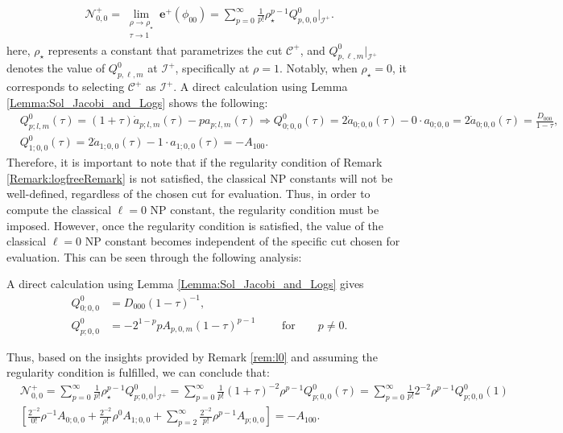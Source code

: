 \begin{align}
  \mathcal{N}^{+}_{0,0}= \lim_{\substack{\rho \to \rho_{\star} \\ \tau \to 1}}  \boldsymbol{e}^{+}(\phi_{00}) = \sum_{p=0}^{\infty} \frac{1}{p!}\rho^{p-1}_{\star}Q^{0}_{p,0,0}|_{\mathscr{I}^{+}}.
\end{align}
here, $\rho_{\star}$ represents a constant that parametrizes the cut $\mathcal{C}^{+}$, and $Q^{0}_{p,\ell,m}|_{\mathscr{I}^{+}}$ denotes the value of $Q^{0}_{p,\ell,m}$ at $\mathscr{I}^{+}$, specifically at $\rho=1$. Notably, when $\rho_{\star}=0$, it corresponds to selecting $\mathcal{C}^{+}$ as $\mathcal{I}^{+}$.
A direct calculation using Lemma \ref{Lemma:Sol_Jacobi_and_Logs} shows the following:
\begin{align}\label{eq:Q0lm}
  & Q_{p;l,m}^{0}(\tau)=(1+\tau) \dot{a}_{p ; l, m}(\tau)-pa_{p ; l, m}(\tau) \Rightarrow Q_{0;0,0}^{0}(\tau)=2 \dot{a}_{0;0,0}(\tau)-0 \cdot a_{0;0,0} =2 \dot{a}_{0;0,0}(\tau)=\frac{D_{000}}{1-\tau}, \\
  & Q_{1;0,0}^{0}(\tau)=2 \dot{a}_{1;0,0}(\tau)-1 \cdot a_{1;0,0}(\tau)=-A_{100}.
\end{align}
Therefore, it is important to note that if the regularity condition of Remark \ref{Remark:logfreeRemark} is not satisfied, the classical NP constants will not be well-defined, regardless of the chosen cut for evaluation. Thus, in order to compute the classical $\ell=0$ NP constant, the regularity condition must be imposed. However, once the regularity condition is satisfied, the value of the classical $\ell=0$ NP constant becomes independent of the specific cut chosen for evaluation. This can be seen through the following analysis:
\begin{remark}\label{rem:l0}
  A direct calculation
using Lemma \ref{Lemma:Sol_Jacobi_and_Logs}
gives
 \begin{subequations}\label{eq:rem:l0}
 \begin{align}
   Q^{0}_{0;0,0}&=D_{000}(1-\tau)^{-1},\label{rem:l0:eq1} \\
   Q^{0}_{p;0,0}&=-2^{1-p}pA_{p,0,m}(1-\tau)^{p-1} \qquad \text{ for}\qquad p\neq 0.
   \label{rem:l0:eq2}
 \end{align}
\end{subequations}
\end{remark}
Thus, based on the insights provided by Remark \ref{rem:l0} and assuming the regularity condition is fulfilled, we can conclude that:
\begin{align}
  &\mathcal{N}^{+}_{0,0}= \sum_{p=0}^{\infty} \frac{1}{p!}\rho^{p-1}_{\star}Q^{0}_{p;0,0}|_{\mathscr{I}^{+}} = \sum_{p=0}^{\infty} \frac{1}{p !}(1+\tau)^{-2} \rho^{p-1} Q_{p; 0,0}^{0}(\tau) = \sum_{p=0}^{\infty} \frac{1}{p !} 2^{-2} \rho^{p-1} Q_{p; 0,0}^{0}(1) \nonumber \\
  & \left[\frac{2^{-2}}{0 !} \rho^{-1} A_{0;0,0} +\frac{2^{-2}}{\rho !} \rho^{0} A_{1;0,0} +\sum_{p=2}^{\infty} \frac{2^{-2}}{p !} \rho^{p-1} A_{p;0,0}\right] = -A_{100}.
\end{align}

